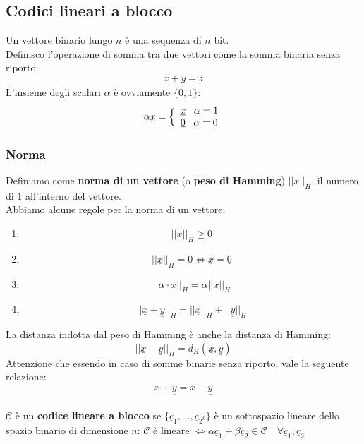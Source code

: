 \documentclass{article}
\begin{document}
\subsection{Codici lineari a blocco}
Un vettore binario lungo $n$ è una sequenza di $n$ bit.\\
Definisco l'operazione di somma tra due vettori come la somma binaria senza riporto:
$$\underline{x}+\underline{y}=\underline{z}$$
L'insieme degli scalari $\alpha$ è ovviamente $\{0,1\}$:
$$\alpha\underline{x}=\Bigl\{
\begin{array}{c}
	\underline{x}\;\;\;\alpha=1\\
	\underline{0}\;\;\;\alpha=0
\end{array}$$

\subsubsection{Norma}
Definiamo come \textbf{norma di un vettore} (o \textbf{peso di Hamming}) $||\underline{x}||_H$, il numero di $1$ all'interno del vettore.\\
Abbiamo alcune regole per la norma di un vettore:
\begin{enumerate}
	\item $$||\underline{x}||_H\geq0$$
	\item $$||\underline{x}||_H=0\iff\underline{x}=\underline{0}$$
	\item $$||\alpha\cdot\underline{x}||_H=\alpha||\underline{x}||_H$$
	\item $$||\underline{x}+\underline{y}||_H=||\underline{x}||_H+||\underline{y}||_H$$
\end{enumerate}
La distanza indotta dal peso di Hamming è anche la distanza di Hamming: $$||\underline{x}-\underline{y}||_H=d_H(\underline{x},\underline{y})$$
Attenzione che essendo in caso di somme binarie senza riporto, vale la seguente relazione:
$$\underline{x}+\underline{y}=\underline{x}-\underline{y}$$\\
$\mathcal{C}$ è un \textbf{codice lineare a blocco} se $\{\underline{c}_1,...,\underline{c}_{2^k}\}$ è un sottospazio lineare dello spazio binario di dimensione $n$: $\mathcal{C}$ è lineare $\iff\alpha\underline{c}_1+\beta\underline{c}_2\in\mathcal{C}\quad\forall\underline{c}_1,\underline{c}_2$\\
\end{document}
